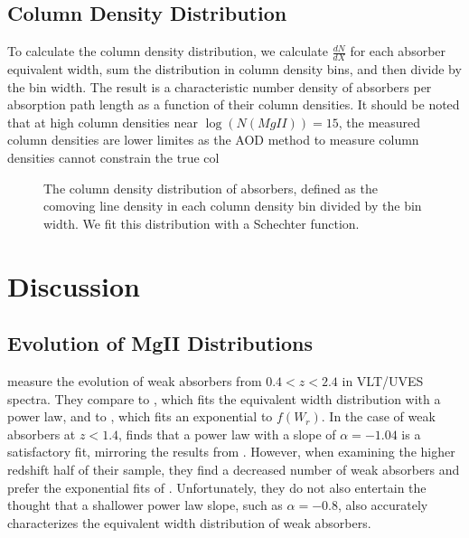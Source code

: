 \documentclass[iop,apj,numberedappendix,appendixfloats,twocolappendix]{emulateapj}
\begin{document}
\subsection{Column Density Distribution}
\label{sec:logndistro}

To calculate the column density distribution, we calculate $\frac{dN}{dX}$ for each absorber equivalent width, sum the distribution in column density bins, and then divide by the bin width. The result is a characteristic number density of {\MgII} absorbers per absorption path length as a function of their column densities. It should be noted that at high column densities near $\log (N(MgII)) = 15$, the measured column densities are lower limites as the AOD method to measure column densities cannot constrain the true col

\begin{figure*}[bth]
\caption{The column density distribution of {\MgII} absorbers, defined as the comoving line density in each column density bin divided by the bin width. We fit this distribution with a Schechter function.}
\label{fig:dndx_cuts}
\end{figure*}


\section{Discussion}
\label{sec:discussion}

\subsection{Evolution of MgII Distributions}

\cite{Narayanan2007} measure the evolution of weak {\MgII} absorbers from $0.4 < z < 2.4$ in VLT/UVES spectra. They compare to \cite{Churchill1999}, which fits the equivalent width distribution with a power law, and to \cite{Nestor2005}, which fits an exponential to $f(W_r)$. In the case of weak absorbers at $z < 1.4$, \cite{Narayanan2007} finds that a power law with a slope of $\alpha = -1.04$ is a satisfactory fit, mirroring the results from \cite{Churchill1999}. However, when examining the higher redshift half of their sample, they find a decreased number of weak {\MgII} absorbers and prefer the exponential fits of \cite{Nestor2005}. Unfortunately, they do not also entertain the thought that a shallower power law slope, such as $\alpha = -0.8$, also accurately characterizes the equivalent width distribution of weak {\MgII} absorbers. 
\end{document}
